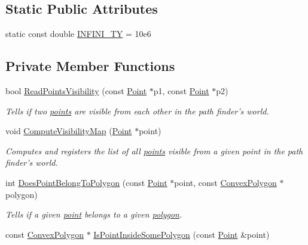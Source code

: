 \subsection*{Static Public Attributes}
\begin{DoxyCompactItemize}
\item 
static const double \hyperlink{classPathFinder_a341ee3901465d58e8aad2fc0dd227168}{INFINI\_\-TY} = 10e6
\end{DoxyCompactItemize}
\subsection*{Private Member Functions}
\begin{DoxyCompactItemize}
\item 
bool \hyperlink{classPathFinder_ab8c06520b832da1cda6f781177af982b}{ReadPointsVisibility} (const \hyperlink{structPathFinder_1_1Point}{Point} $\ast$p1, const \hyperlink{structPathFinder_1_1Point}{Point} $\ast$p2)
\begin{DoxyCompactList}\small\item\em Tells if two \hyperlink{structPathFinder_1_1Point}{points} are visible from each other in the path finder's world. \item\end{DoxyCompactList}\item 
void \hyperlink{classPathFinder_ae567b0e270b68f6b38e9b2fafccdc9ef}{ComputeVisibilityMap} (\hyperlink{structPathFinder_1_1Point}{Point} $\ast$point)
\begin{DoxyCompactList}\small\item\em Computes and registers the list of all \hyperlink{structPathFinder_1_1Point}{points} visible from a given point in the path finder's world. \item\end{DoxyCompactList}\item 
int \hyperlink{classPathFinder_ad12ed53e6e67ee4408a757bbca18058d}{DoesPointBelongToPolygon} (const \hyperlink{structPathFinder_1_1Point}{Point} $\ast$point, const \hyperlink{structPathFinder_1_1ConvexPolygon}{ConvexPolygon} $\ast$polygon)
\begin{DoxyCompactList}\small\item\em Tells if a given \hyperlink{structPathFinder_1_1Point}{point} belongs to a given \hyperlink{structPathFinder_1_1ConvexPolygon}{polygon}. \item\end{DoxyCompactList}\item 
const \hyperlink{structPathFinder_1_1ConvexPolygon}{ConvexPolygon} $\ast$ \hyperlink{classPathFinder_a465f6557bd6f5462dc0c363426f43322}{IsPointInsideSomePolygon} (const \hyperlink{structPathFinder_1_1Point}{Point} \&point)

\end{DoxyCompactItemize}
